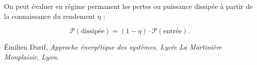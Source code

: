 \documentclass[10pt,fleqn]{article} %
\begin{document}
\begin{prop}
On peut évaluer en régime permanent les pertes ou puissance dissipée à partir de la connaissance du rendement $\eta$ : 

$$\mathcal{P}(\text{dissipée})=(1-\eta)\cdot \mathcal{P}(\text{entrée}).
$$


\end{prop}


\begin{thebibliography}{2}
    Émilien Durif, {\it Approche énergétique des systèmes, Lycée La Martinière Monplaisir, Lyon.}
\end{thebibliography}
\end{document}
